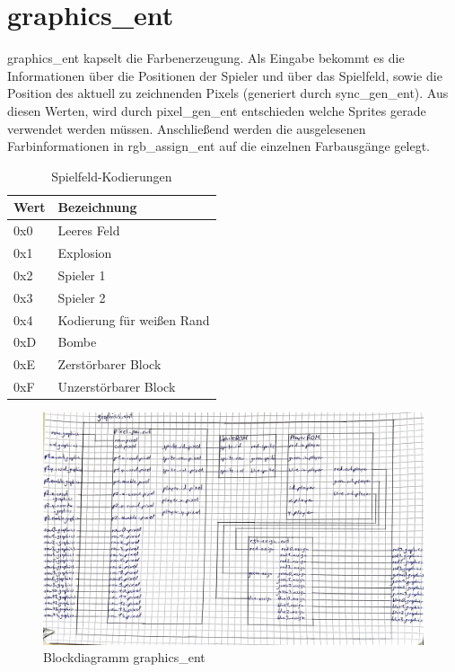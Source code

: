 \documentclass[parskip=full]{scrartcl}
\begin{document}
		\section{graphics\_ent}
			graphics\_ent kapselt die Farbenerzeugung. Als Eingabe bekommt es die Informationen über die Positionen der Spieler und über das Spielfeld, sowie die Position des aktuell zu zeichnenden Pixels (generiert durch sync\_gen\_ent). Aus diesen Werten, wird durch pixel\_gen\_ent entschieden welche Sprites gerade verwendet werden müssen. Anschließend werden die ausgelesenen Farbinformationen in rgb\_assign\_ent auf die einzelnen Farbausgänge gelegt.\newline
			
			\begin{table}[H]
				\centering
				\label{tileCode}
				\begin{tabular}{|l|l|}
					\hline
					\textbf{Wert} & \textbf{Bezeichnung}      \\ \hline
					0x0           & Leeres Feld               \\ \hline
					0x1           & Explosion                 \\ \hline
					0x2           & Spieler 1                 \\ \hline
					0x3           & Spieler 2                 \\ \hline
					0x4           & Kodierung für weißen Rand \\ \hline
					0xD           & Bombe                     \\ \hline
					0xE           & Zerstörbarer Block        \\ \hline
					0xF           & Unzerstörbarer Block      \\ \hline
				\end{tabular}
				\caption{Spielfeld-Kodierungen}
			\end{table}
		
			\begin{figure}[H]
				\centering
				\includegraphics[angle=90,scale=0.1]{./bilder/graphics_ent.jpg}
				\caption{Blockdiagramm graphics\_ent}
			\end{figure}
			
\end{document}
